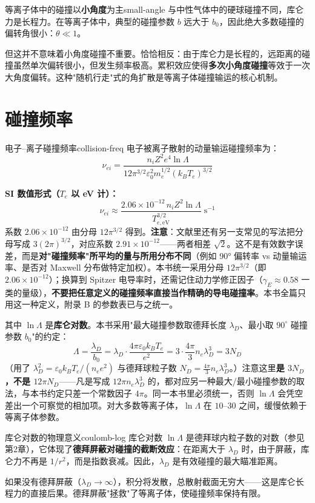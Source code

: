 \documentclass[12pt,a4paper,openany,oneside]{book}
\newcommand{\eps}{\varepsilon}
\newcommand{\difficulty}[1]{\marginnote{\hfill\textcolor{coverMid!80}{\rule[-0.1em]{2pt}{0.9em}}\,\textcolor{coverMid}{\footnotesize\textbf{[#1]}}}}
\begin{document}
\begin{insight}{等离子体中的碰撞以\textbf{小角度}为主}{small-angle}
与中性气体中的硬球碰撞不同，库仑力是长程力。在等离子体中，典型的碰撞参数 $b$ 远大于 $b_0$，因此绝大多数碰撞的偏转角很小：$\theta \ll 1$。

但这并不意味着小角度碰撞不重要。恰恰相反：由于库仑力是长程的，远距离的碰撞虽然单次偏转很小，但发生频率极高。累积效应使得\textbf{多次小角度碰撞}等效于一次大角度偏转。这种"随机行走"式的角扩散是等离子体碰撞输运的核心机制。
\end{insight}

\section{碰撞频率}\difficulty{提高}

\begin{theorem}{电子--离子碰撞频率}{collision-freq}
电子被离子散射的动量输运碰撞频率为：
\[
\nu_{ei} = \frac{n_i Z^2 e^4 \ln\Lambda}{12\pi^{3/2}\eps_0^2 m_e^{1/2}(k_B T_e)^{3/2}}
\]

\textbf{SI 数值形式（$T_e$ 以 eV 计）：}
\[
\nu_{ei} \approx \frac{2.06\times10^{-12}\,n_i Z^2\ln\Lambda}{T_{e,\mathrm{eV}}^{3/2}}\;\mathrm{s^{-1}}
\]
系数 $2.06\times10^{-12}$ 由分母 $12\pi^{3/2}$ 得到。\textbf{注意}：文献里还有另一支常见的写法把分母写成 $3(2\pi)^{3/2}$，对应系数 $2.91\times10^{-12}$——两者相差 $\sqrt2$。这不是有效数字误差，而是\textbf{对"碰撞频率"所平均的量与所用分布不同}（例如 90° 偏转率 vs 动量输运率、是否对 Maxwell 分布做特定加权）。本书统一采用分母 $12\pi^{3/2}$（即 $2.06\times10^{-12}$）；换算到 Spitzer 电导率时，还需记住动力学修正因子（$\gamma_E\approx0.58$ 一类的量级），\textbf{不要把任意定义的碰撞频率直接当作精确的导电碰撞率}。本书全篇只用这一种定义，附录 B 的参数表已与之统一。

其中 $\ln\Lambda$ 是\textbf{库仑对数}。本书采用"最大碰撞参数取德拜长度 $\lambda_D$、最小取 $90^\circ$ 碰撞参数 $b_0$"的约定：
\[
\Lambda = \frac{\lambda_D}{b_0} = \lambda_D\cdot\frac{4\pi\eps_0 k_BT_e}{e^2} = 3\cdot\frac{4\pi}{3}n_e\lambda_D^3 = 3N_D
\]
（用了 $\lambda_D^2=\eps_0k_BT_e/(n_ee^2)$ 与德拜球粒子数 $N_D=\frac{4\pi}{3}n_e\lambda_D^3$。）注意这里\textbf{是 $3N_D$，不是 $12\pi N_D$}——凡是写成 $12\pi n_e\lambda_D^3$ 的，都对应另一种最大/最小碰撞参数的取法，与本书约定只差一个常数因子 $4\pi$。同一本书里必须统一，否则 $\ln\Lambda$ 会凭空差出一个可察觉的相加项。对大多数等离子体，$\ln\Lambda$ 在 $10$--$30$ 之间，缓慢依赖于等离子体参数。
\end{theorem}

\begin{insight}{库仑对数的物理意义}{coulomb-log}
库仑对数 $\ln\Lambda$ 是德拜球内粒子数的对数（参见第2章），它体现了\textbf{德拜屏蔽对碰撞的截断效应}：在距离大于 $\lambda_D$ 时，由于屏蔽，库仑力不再是 $1/r^2$，而是指数衰减。因此，$\lambda_D$ 是有效碰撞的最大瞄准距离。

如果没有德拜屏蔽（$\lambda_D \to \infty$），积分将发散，总散射截面无穷大——这是库仑长程力的直接后果。德拜屏蔽"拯救"了等离子体，使碰撞频率保持有限。
\end{insight}
\end{document}
